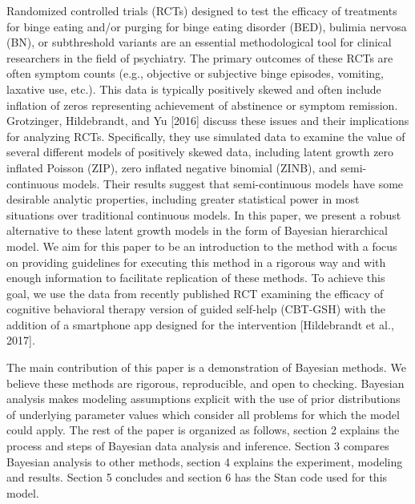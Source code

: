 \documentclass{article}
\begin{document}
Randomized controlled trials (RCTs) designed to test the efficacy of treatments for binge eating and/or purging for binge eating disorder (BED), bulimia nervosa (BN), or subthreshold variants are an essential methodological tool for clinical researchers in the field of psychiatry.  The primary outcomes of these RCTs are often symptom counts (e.g., objective or subjective binge episodes, vomiting, laxative use, etc.). This data is typically positively skewed and often include inflation of zeros representing achievement of abstinence or symptom remission.  Grotzinger, Hildebrandt, and Yu [2016] discuss these issues and their implications for analyzing RCTs.  Specifically, they use simulated data to examine the value of several different models of positively skewed data, including latent growth zero inflated Poisson (ZIP), zero inflated negative binomial (ZINB), and semi-continuous models.  Their results suggest that semi-continuous models have some desirable analytic properties, including greater statistical power in most situations over traditional continuous models.  In this paper, we present a robust alternative to these latent growth models in the form of Bayesian hierarchical model.  We aim for this paper to be an introduction to the method with a focus on providing guidelines for executing this method in a rigorous way and with enough information to facilitate replication of these methods.  To achieve this goal, we use the data from recently published RCT examining the efficacy of cognitive behavioral therapy version of guided self-help (CBT-GSH) with the addition of a smartphone app designed for the intervention [Hildebrandt et al., 2017]. 

The main contribution of this paper is a demonstration of Bayesian methods. We believe these methods are rigorous, reproducible, and open to checking. Bayesian analysis makes modeling assumptions explicit with the use of prior distributions of underlying parameter values which consider all  problems for which the model could apply.  The rest of the paper is organized as follows, section 2 explains the process and steps of Bayesian data analysis and inference. Section 3 compares Bayesian analysis to other methods, section 4 explains the experiment, modeling and results. Section 5 concludes and section 6 has the Stan code used for this model.
\end{document}
